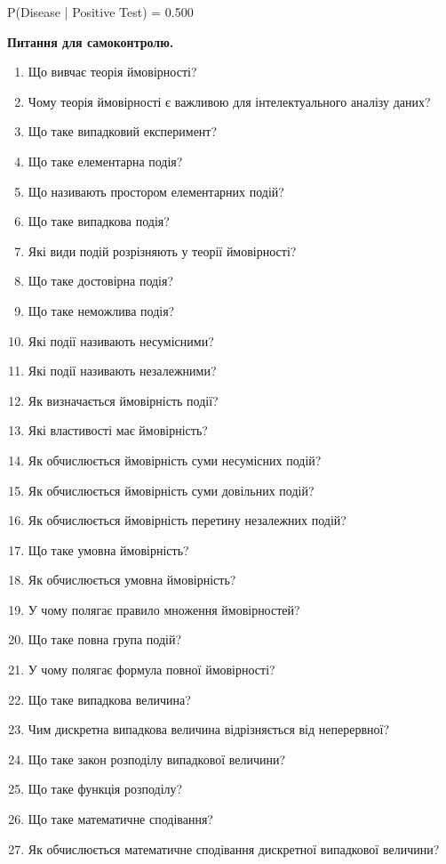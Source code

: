 \begin{console}
P(Disease | Positive Test) = 0.500
\end{console}


 \textbf{Питання для самоконтролю.}

\begin{enumerate}
\item Що вивчає теорія ймовірності?
\item Чому теорія ймовірності є важливою для інтелектуального аналізу даних?
\item Що таке випадковий експеримент?
\item Що таке елементарна подія?
\item Що називають простором елементарних подій?
\item Що таке випадкова подія?
\item Які види подій розрізняють у теорії ймовірності?
\item Що таке достовірна подія?
\item Що таке неможлива подія?
\item Які події називають несумісними?
\item Які події називають незалежними?
\item Як визначається ймовірність події?
\item Які властивості має ймовірність?
\item Як обчислюється ймовірність суми несумісних подій?
\item Як обчислюється ймовірність суми довільних подій?
\item Як обчислюється ймовірність перетину незалежних подій?
\item Що таке умовна ймовірність?
\item Як обчислюється умовна ймовірність?
\item У чому полягає правило множення ймовірностей?
\item Що таке повна група подій?
\item У чому полягає формула повної ймовірності?
\item Що таке випадкова величина?
\item Чим дискретна випадкова величина відрізняється від неперервної?
\item Що таке закон розподілу випадкової величини?
\item Що таке функція розподілу?
\item Що таке математичне сподівання?
\item Як обчислюється математичне сподівання дискретної випадкової величини?

\end{enumerate}
